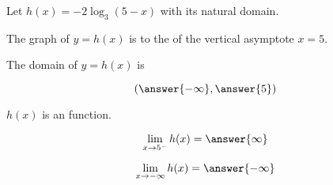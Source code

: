 \documentclass{ximera}
\author{Lee Wayand}
\begin{document}
\begin{exercise}






Let $h(x) = -2 \log_3(5-x)$ with its natural domain. \\





\begin{question}


The graph of $y = h(x)$ is to the  of the vertical asymptote $x = 5$.


\end{question}





\begin{question}


The domain of $y = h(x)$ is 

\[
\left( \answer{-\infty}, \answer{5} \right)
\]


\end{question}






\begin{question}


$h(x)$ is an  function.


\end{question}











\begin{question}


\[
\lim\limits_{x \to 5^-} h(x) = \answer{\infty}
\]


\end{question}








\begin{question}


\[
\lim\limits_{x \to -\infty} h(x) = \answer{-\infty}
\]


\end{question}










\end{exercise}
\end{document}
